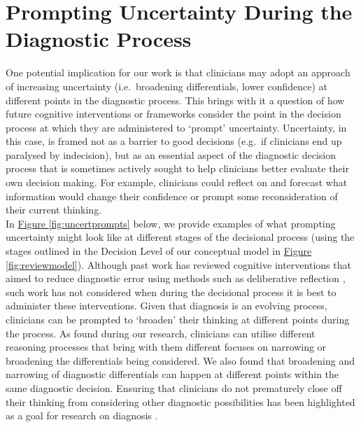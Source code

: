 \documentclass[a4paper, nobind]{templates/ociamthesis}
\begin{document}
\section{Prompting Uncertainty During the Diagnostic Process}\label{prompting-uncertainty-during-the-diagnostic-process}

One potential implication for our work is that clinicians may adopt an approach of increasing uncertainty (i.e.~broadening differentials, lower confidence) at different points in the diagnostic process. This brings with it a question of how future cognitive interventions or frameworks consider the point in the decision process at which they are administered to `prompt' uncertainty. Uncertainty, in this case, is framed not as a barrier to good decisions (e.g.~if clinicians end up paralysed by indecision), but as an essential aspect of the diagnostic decision process that is sometimes actively sought to help clinicians better evaluate their own decision making. For example, clinicians could reflect on and forecast what information would change their confidence or prompt some reconsideration of their current thinking.\\

In \hyperref[fig:uncertprompts]{Figure \ref{fig:uncertprompts}} below, we provide examples of what prompting uncertainty might look like at different stages of the decisional process (using the stages outlined in the Decision Level of our conceptual model in \hyperref[fig:reviewmodel]{Figure \ref{fig:reviewmodel}}). Although past work has reviewed cognitive interventions that aimed to reduce diagnostic error \autocite{graber_cognitive_2012,lambe_dual-process_2016,dave_interventions_2022} using methods such as deliberative reflection \autocite{norman_etiology_2014,lambe_guided_2018,costa_filho_effects_2019,kuhn_learning_2023}, such work has not considered when during the decisional process it is best to administer these interventions. Given that diagnosis is an evolving process, clinicians can be prompted to `broaden' their thinking at different points during the process. As found during our research, clinicians can utilise different reasoning processes that bring with them different focuses on narrowing or broadening the differentials being considered. We also found that broadening and narrowing of diagnostic differentials can happen at different points within the same diagnostic decision. Ensuring that clinicians do not prematurely close off their thinking from considering other diagnostic possibilities has been highlighted as a goal for research on diagnosis \autocite{krupat_avoiding_2017}.
\end{document}
